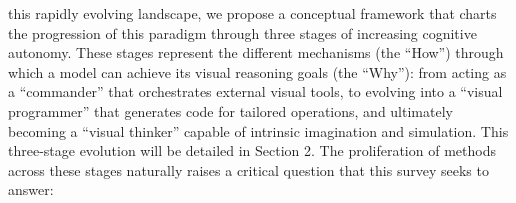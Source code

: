 this rapidly evolving landscape, we propose a conceptual framework that charts the progression of this paradigm through three stages of increasing cognitive autonomy. These stages represent the different mechanisms (the “How”) through which a model can achieve its visual reasoning goals (the “Why”): from acting as a “commander” that orchestrates external visual tools, to evolving into a “visual programmer” that generates code for tailored operations, and ultimately becoming a “visual thinker” capable of intrinsic imagination and simulation. This three-stage evolution will be detailed in Section 2. The proliferation of methods across these stages naturally raises a critical question that this survey seeks to answer:




